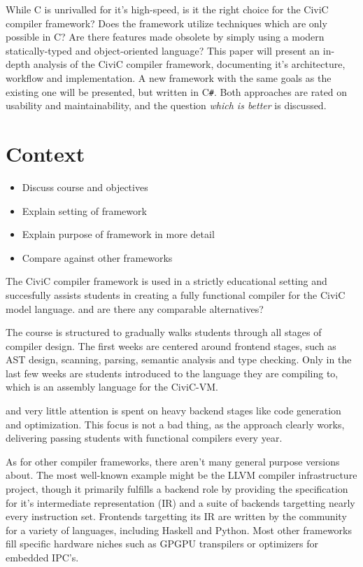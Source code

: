 \documentclass[twoside,openright]{uva-bachelor-thesis}
\newcommand{\cs}{C\texttt{\#}\xspace}
\begin{document}
		While C is unrivalled for it's high-speed, is it the right choice for the CiviC compiler framework? Does the framework utilize techniques which are only possible in C? Are there features made obsolete by simply using a modern statically-typed and object-oriented language? This paper will present an in-depth analysis of the CiviC compiler framework, documenting it's architecture, workflow and implementation. A new framework with the same goals as the existing one will be presented, but written in \cs. Both approaches are rated on usability and maintainability, and the  question \emph{which is better} is discussed.
		
			
	\section{Context}
		\begin{itemize}
			\item Discuss course and objectives
			\item Explain setting of framework
			\item Explain purpose of framework in more detail
			\item Compare against other frameworks
		\end{itemize}
	
		The CiviC compiler framework is used in a strictly educational setting and succesfully assists students in creating a  fully functional compiler for the CiviC model language.  and are there any comparable alternatives?
		
		The course is structured to gradually walks students through all stages of compiler design. The first weeks are centered around frontend stages, such as AST design, scanning, parsing, semantic analysis and type checking. Only in the last few weeks are students introduced to the language they are compiling to, which is an assembly language for the CiviC-VM. 
		
		and very little attention is spent on heavy backend stages like code generation and optimization. This focus is not a bad thing, as the approach clearly works, delivering passing students with functional compilers every year.
				
		As for other compiler frameworks, there aren't many general purpose versions about. The most well-known example might be the LLVM compiler infrastructure project\cite{lattner2002llvm}, though it primarily fulfills a backend role by providing the specification for it's intermediate representation (IR) and a suite of backends targetting nearly every instruction set. Frontends targetting its IR are written by the community for a variety of languages, including Haskell and Python. Most other frameworks fill specific hardware niches such as GPGPU transpilers or optimizers for embedded IPC's.
		
\end{document}
